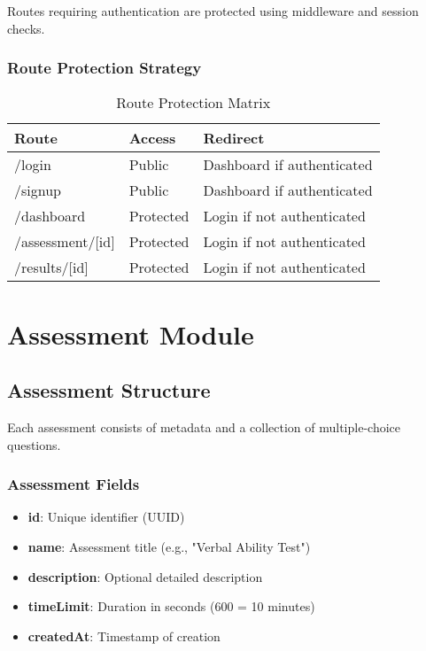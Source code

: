 \documentclass[12pt,a4paper]{report}
\begin{document}
Routes requiring authentication are protected using middleware and session checks.

\subsection{Route Protection Strategy}

\begin{table}[H]
\centering
\caption{Route Protection Matrix}
\begin{tabular}{@{}lll@{}}
\toprule
\textbf{Route} & \textbf{Access} & \textbf{Redirect} \\ \midrule
/login & Public & Dashboard if authenticated \\
/signup & Public & Dashboard if authenticated \\
/dashboard & Protected & Login if not authenticated \\
/assessment/[id] & Protected & Login if not authenticated \\
/results/[id] & Protected & Login if not authenticated \\ \bottomrule
\end{tabular}
\end{table}

\chapter{Assessment Module}

\section{Assessment Structure}

Each assessment consists of metadata and a collection of multiple-choice questions.

\subsection{Assessment Fields}

\begin{itemize}
    \item \textbf{id}: Unique identifier (UUID)
    \item \textbf{name}: Assessment title (e.g., "Verbal Ability Test")
    \item \textbf{description}: Optional detailed description
    \item \textbf{timeLimit}: Duration in seconds (600 = 10 minutes)
    \item \textbf{createdAt}: Timestamp of creation
\end{itemize}
\end{document}
